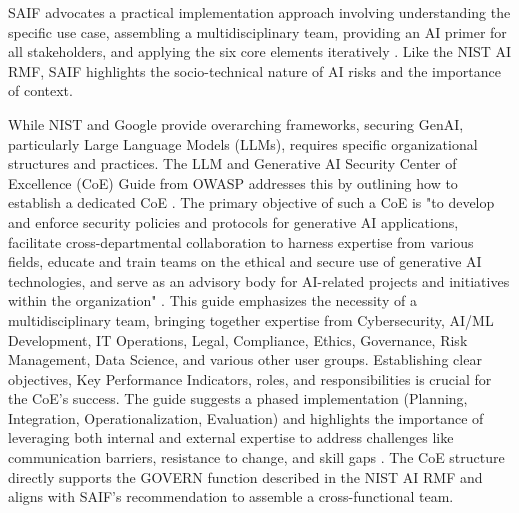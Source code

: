 SAIF advocates a practical implementation approach involving understanding the specific use case, assembling a multidisciplinary team, providing an AI primer for all stakeholders, and applying the six core elements iteratively \cite{hansen_introducing_2023}. Like the NIST AI RMF, SAIF highlights the socio-technical nature of AI risks and the importance of context.

While NIST and Google provide overarching frameworks, securing GenAI, particularly Large Language Models (LLMs), requires specific organizational structures and practices. The LLM and Generative AI Security Center of Excellence (CoE) Guide from OWASP addresses this by outlining how to establish a dedicated CoE \cite{OWASP:2024:LLMCOEGuide}. The primary objective of such a CoE is "to develop and enforce security policies and protocols for generative AI applications, facilitate cross-departmental collaboration to harness expertise from various fields, educate and train teams on the ethical and secure use of generative AI technologies, and serve as an advisory body for AI-related projects and initiatives within the organization" \cite[p.4]{OWASP:2024:LLMCOEGuide}. This guide emphasizes the necessity of a multidisciplinary team, bringing together expertise from Cybersecurity, AI/ML Development, IT Operations, Legal, Compliance, Ethics, Governance, Risk Management, Data Science, and various other user groups\cite{OWASP:2024:LLMCOEGuide}. Establishing clear objectives, Key Performance Indicators, roles, and responsibilities is crucial for the CoE's success. The guide suggests a phased implementation (Planning, Integration, Operationalization, Evaluation) and highlights the importance of leveraging both internal and external expertise to address challenges like communication barriers, resistance to change, and skill gaps \cite{OWASP:2024:LLMCOEGuide}. The CoE structure directly supports the GOVERN function described in the NIST AI RMF and aligns with SAIF's recommendation to assemble a cross-functional team.

